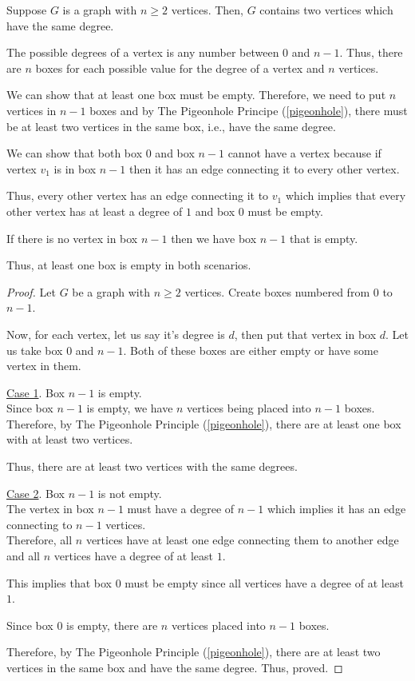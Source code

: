 \begin{proposition}
  Suppose $G$ is a graph with $n \geq 2$ vertices. Then, $G$ contains two vertices which have the same degree.
\end{proposition}

\begin{proof idea}
  The possible degrees of a vertex is any number between $0$ and $n-1$.
  Thus, there are $n$ boxes for each possible value for the degree of a vertex and $n$ vertices.

  We can show that at least one box must be empty. Therefore, we need to put $n$ vertices in $n-1$ boxes and by The Pigeonhole Principe (\ref{pigeonhole}), there must be at least two vertices in the same box, i.e., have the same degree.

  We can show that both box $0$ and box $n-1$ cannot have a vertex because if vertex $v_1$ is in box $n-1$ then it has an edge connecting it to every other vertex.

  Thus, every other vertex has an edge connecting it to $v_1$ which implies that every other vertex has at least a degree of $1$ and box $0$ must be empty.

  If there is no vertex in box $n-1$ then we have box $n-1$ that is empty.

  Thus, at least one box is empty in both scenarios.
\end{proof idea}

\begin{proof}
  Let $G$ be a graph with $n \geq 2$ vertices. Create boxes numbered from $0$ to $n-1$.

  Now, for each vertex, let us say it's degree is $d$, then put that vertex in box $d$. Let us take box $0$ and $n-1$. Both of these boxes are either empty or have some vertex in them.

  \bigbreak
  \underline{Case 1}. Box $n-1$ is empty. \\
  Since box $n-1$ is empty, we have $n$ vertices being placed into $n-1$ boxes.
  Therefore, by The Pigeonhole Principle (\ref{pigeonhole}), there are at least one box with at least two vertices.

  Thus, there are at least two vertices with the same degrees.

  \bigbreak
  \underline{Case 2}. Box $n-1$ is not empty. \\
  The vertex in box $n-1$ must have a degree of $n-1$ which implies it has an edge connecting to $n-1$ vertices. \\
  Therefore, all $n$ vertices have at least one edge connecting them to another edge and all $n$ vertices have a degree of at least $1$.

  This implies that box $0$ must be empty since all vertices have a degree of at least $1$.

Since box $0$ is empty, there are $n$ vertices placed into $n-1$ boxes.

Therefore, by The Pigeonhole Principle (\ref{pigeonhole}), there are at least two vertices in the same box and have the same degree.
\bigbreak
Thus, proved.

\end{proof}


